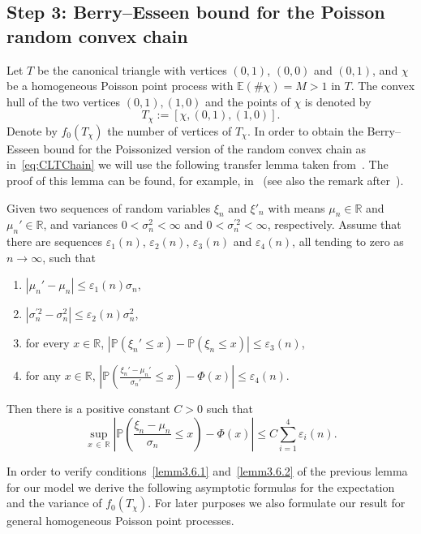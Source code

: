 \documentclass[AHL,Unicode,longabstracts,published]{cedram}
\newcommand{\bbR}{\mathbb{R}}
\newcommand{\bbE}{\mathbb{E}}
\newcommand{\bbP}{\mathbb{P}}
\newcommand*{\romanenumi}{\renewcommand*{\theenumi}{\roman{enumi}}}
\begin{document}
\subsection{Step 3: Berry--Esseen bound for the Poisson random convex chain}\label{step3}

Let $T$ be the canonical triangle with vertices $(0,1)$, $(0,0)$ and $(0,1)$, and $\chi$ be a homogeneous Poisson point process with $\bbE(\#\chi)=M>1$ in $T$. The convex hull of the two vertices $(0,1), (1,0)$ and the points of $\chi$ is denoted by
\[
T_{\chi}:= [\chi, (0,1),(1,0)].
\]
Denote by $f_0(T_\chi)$ the number of vertices of $T_\chi$. In order to obtain the Berry--Esseen bound for the Poissonized version of the random convex chain as in~\eqref{eq:CLTChain} we will use the following transfer lemma taken from~\cite[Lemma~3.2]{BR10}. The proof of this lemma can be found, for example, in~\cite{BV06} (see also the remark after~\cite[Lemma~3.2]{BR10}).


\begin{lemm}\label{lm:transference}
Given two sequences of random variables $\xi_n$ and $\xi'_n$ with means $\mu_n\in\bbR$ and $\mu_n'\in\bbR$, and variances $0<\sigma_n^2<\infty$ and $0<\sigma_n^{'2}<\infty$, respectively. Assume that there are sequences $\varepsilon_1(n)$, $\varepsilon_2(n)$, $\varepsilon_3(n)$ and $\varepsilon_4(n)$, all tending to zero as $n\to \infty$, such that
\begin{enumerate}\romanenumi
\item\label{lemm3.6.1} $|\mu_n'-\mu_n|\leq \varepsilon_1(n)\sigma_n$,
\item\label{lemm3.6.2} $|\sigma_n^{'2}-\sigma_n^2|\leq \varepsilon_2(n)\sigma_n^{2}$,
\item\label{lemm3.6.3} for every $x\in\bbR$, $|\bbP(\xi_n'\leq x)-\bbP(\xi_n\leq x)|\leq \varepsilon_3(n)$,
\item\label{lemm3.6.4} for any $x\in\bbR$, $
|\bbP(\frac{\xi_n'-\mu_n'}{\sigma_n'}\leq x)-\Phi(x)|\leq \varepsilon_4(n). $
\end{enumerate}
Then there is a positive constant $C>0$ such that
\[
\sup_{x\,\in\,\bbR}\left|\bbP\left(\frac{\xi_n-\mu_n}{\sigma_n}\leq x\right)-\Phi(x)\right|\leq C\sum_{i=1}^4\varepsilon_i(n).
\]
\end{lemm}

In order to verify conditions~\eqref{lemm3.6.1} and~\eqref{lemm3.6.2}  of the previous lemma for our model we derive the following asymptotic formulas for the expectation and the variance of $f_0(T_{\chi})$. For later purposes we also formulate our result for general homogeneous Poisson point processes.
\end{document}
